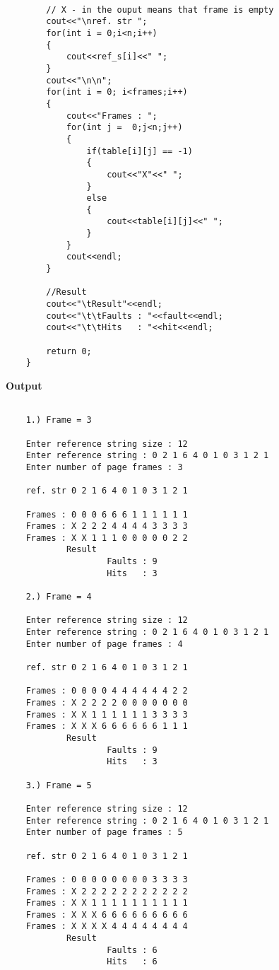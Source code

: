 \documentclass{article}
\begin{document}
\begin{enumerate}
{\begin{verbatim}
    
        // X - in the ouput means that frame is empty
        cout<<"\nref. str ";
        for(int i = 0;i<n;i++)
        {
            cout<<ref_s[i]<<" ";
        }
        cout<<"\n\n";
        for(int i = 0; i<frames;i++)
        {
            cout<<"Frames : ";
            for(int j =  0;j<n;j++)
            {
                if(table[i][j] == -1)
                {
                    cout<<"X"<<" ";
                }
                else
                {
                    cout<<table[i][j]<<" ";
                }
            }
            cout<<endl;
        }
    
        //Result
        cout<<"\tResult"<<endl;
        cout<<"\t\tFaults : "<<fault<<endl;
        cout<<"\t\tHits   : "<<hit<<endl;
    
        return 0;
    }

\end{verbatim}
\textbf{Output}
\begin{verbatim}
    
    1.) Frame = 3

    Enter reference string size : 12
    Enter reference string : 0 2 1 6 4 0 1 0 3 1 2 1
    Enter number of page frames : 3
    
    ref. str 0 2 1 6 4 0 1 0 3 1 2 1 
    
    Frames : 0 0 0 6 6 6 1 1 1 1 1 1 
    Frames : X 2 2 2 4 4 4 4 3 3 3 3 
    Frames : X X 1 1 1 0 0 0 0 0 2 2 
            Result
                    Faults : 9       
                    Hits   : 3  

    2.) Frame = 4

    Enter reference string size : 12
    Enter reference string : 0 2 1 6 4 0 1 0 3 1 2 1
    Enter number of page frames : 4
    
    ref. str 0 2 1 6 4 0 1 0 3 1 2 1 
    
    Frames : 0 0 0 0 4 4 4 4 4 4 2 2 
    Frames : X 2 2 2 2 0 0 0 0 0 0 0 
    Frames : X X 1 1 1 1 1 1 3 3 3 3 
    Frames : X X X 6 6 6 6 6 6 1 1 1 
            Result
                    Faults : 9       
                    Hits   : 3    
    
    3.) Frame = 5

    Enter reference string size : 12
    Enter reference string : 0 2 1 6 4 0 1 0 3 1 2 1
    Enter number of page frames : 5
    
    ref. str 0 2 1 6 4 0 1 0 3 1 2 1
    
    Frames : 0 0 0 0 0 0 0 0 3 3 3 3
    Frames : X 2 2 2 2 2 2 2 2 2 2 2
    Frames : X X 1 1 1 1 1 1 1 1 1 1
    Frames : X X X 6 6 6 6 6 6 6 6 6
    Frames : X X X X 4 4 4 4 4 4 4 4
            Result
                    Faults : 6
                    Hits   : 6   

\end{verbatim}
}

\end{enumerate}
\end{document}
